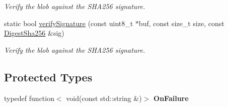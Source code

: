 \begin{DoxyCompactItemize}
\begin{DoxyCompactList}\small\item\em Verify the blob against the S\+H\+A256 signature. \end{DoxyCompactList}\item 
static bool \hyperlink{classndn_1_1Validator_a7efdfd70bf86f47a7ad974d24dfffe22}{verify\+Signature} (const uint8\+\_\+t $\ast$buf, const size\+\_\+t size, const \hyperlink{classndn_1_1DigestSha256}{Digest\+Sha256} \&sig)\hypertarget{classndn_1_1Validator_a7efdfd70bf86f47a7ad974d24dfffe22}{}\label{classndn_1_1Validator_a7efdfd70bf86f47a7ad974d24dfffe22}

\begin{DoxyCompactList}\small\item\em Verify the blob against the S\+H\+A256 signature. \end{DoxyCompactList}\end{DoxyCompactItemize}
\subsection*{Protected Types}
\begin{DoxyCompactItemize}
\item 
typedef function$<$ void(const std\+::string \&)$>$ {\bfseries On\+Failure}\hypertarget{classndn_1_1Validator_a2d5707c1d8a7ba71a2d6e41e52bf8a23}{}\label{classndn_1_1Validator_a2d5707c1d8a7ba71a2d6e41e52bf8a23}

\end{DoxyCompactItemize}
